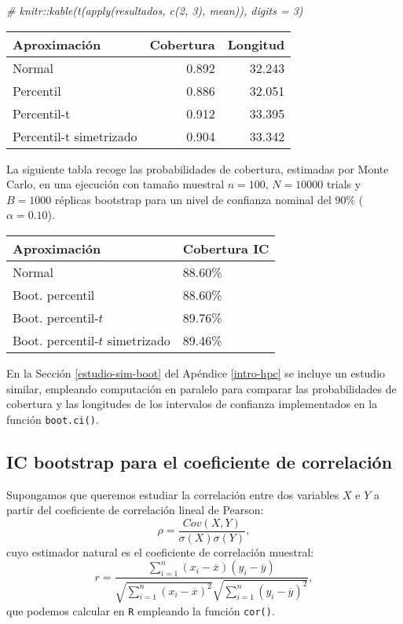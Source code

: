 \documentclass[]{book}
\newenvironment{Shaded}{\begin{snugshade}}{\end{snugshade}}
\newcommand{\CommentTok}[1]{\textcolor[rgb]{0.56,0.35,0.01}{\textit{#1}}}
\theoremstyle{break}
\theoremstyle{definition}
\theoremstyle{definition}
\theoremstyle{definition}
\theoremstyle{remark}
\begin{document}
\begin{Shaded}
\begin{Highlighting}[]
\CommentTok{# knitr::kable(t(apply(resultados, c(2, 3), mean)), digits = 3)}
\end{Highlighting}
\end{Shaded}

\begin{longtable}[]{@{}lrr@{}}
\toprule
Aproximación & Cobertura & Longitud\tabularnewline
\midrule
\endhead
Normal & 0.892 & 32.243\tabularnewline
Percentil & 0.886 & 32.051\tabularnewline
Percentil-t & 0.912 & 33.395\tabularnewline
Percentil-t simetrizado & 0.904 & 33.342\tabularnewline
\bottomrule
\end{longtable}

La siguiente tabla recoge las probabilidades de cobertura, estimadas por
Monte Carlo, en una ejecución con tamaño muestral \(n=100\), \(N=10000\)
trials y \(B=1000\) réplicas bootstrap para un nivel de confianza
nominal del 90\% (\(\alpha =0.10\)).

\begin{longtable}[]{@{}ll@{}}
\toprule
Aproximación & Cobertura IC\tabularnewline
\midrule
\endhead
Normal & 88.60\%\tabularnewline
Boot. percentil & 88.60\%\tabularnewline
Boot. percentil-\(t\) & 89.76\%\tabularnewline
Boot. percentil-\(t\) simetrizado & 89.46\%\tabularnewline
\bottomrule
\end{longtable}

En la Sección \ref{estudio-sim-boot} del Apéndice \ref{intro-hpc} se
incluye un estudio similar, empleando computación en paralelo para
comparar las probabilidades de cobertura y las longitudes de los
intervalos de confianza implementados en la función \texttt{boot.ci()}.

\subsection{IC bootstrap para el coeficiente de
correlación}\label{icboot-trans}

Supongamos que queremos estudiar la correlación entre dos variables
\(X\) e \(Y\) a partir del coeficiente de correlación lineal de Pearson:
\[\rho =\frac{ Cov \left( X, Y \right) }
{ \sigma \left( X \right) \sigma \left( Y \right) },\] cuyo estimador
natural es el coeficiente de correlación muestral:
\[r=\frac{\sum_{i=1}^{n}(x_i-\overline{x})(y_i-\overline{y})}
{\sqrt{ \sum_{i=1}^{n}(x_i-\overline{x})^{2}} 
\sqrt{\sum_{i=1}^{n}(y_i-\overline{y})^{2}}},\] que podemos calcular en
\texttt{R} empleando la función \texttt{cor()}.
\end{document}
